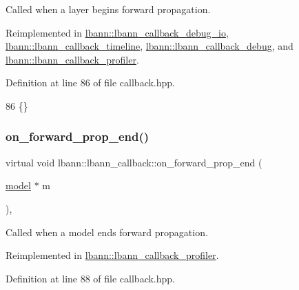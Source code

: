 Called when a layer begins forward propagation. 

Reimplemented in \hyperlink{classlbann_1_1lbann__callback__debug__io_aa31ee265d40edff982ebf38054394927}{lbann\+::lbann\+\_\+callback\+\_\+debug\+\_\+io}, \hyperlink{classlbann_1_1lbann__callback__timeline_a9c093b091fd38b79f8632cf786d29ce2}{lbann\+::lbann\+\_\+callback\+\_\+timeline}, \hyperlink{classlbann_1_1lbann__callback__debug_ac3e88ef582a7e3949b6e016ca2b17459}{lbann\+::lbann\+\_\+callback\+\_\+debug}, and \hyperlink{classlbann_1_1lbann__callback__profiler_adc7cf77381bec8ab1cc5ba5e554ec268}{lbann\+::lbann\+\_\+callback\+\_\+profiler}.



Definition at line 86 of file callback.\+hpp.


\begin{DoxyCode}
86 \{\}
\end{DoxyCode}
\mbox{\label{classlbann_1_1lbann__callback_a79a0bb407852d7b330b74373647ffe46}} 
\subsubsection{\texorpdfstring{on\+\_\+forward\+\_\+prop\+\_\+end()}{on\_forward\_prop\_end()}\hspace{0.1cm}{\footnotesize\ttfamily [1/2]}}
{\footnotesize\ttfamily virtual void lbann\+::lbann\+\_\+callback\+::on\+\_\+forward\+\_\+prop\+\_\+end (\begin{DoxyParamCaption}\item[{\hyperlink{classlbann_1_1model}{model} $\ast$}]{m }\end{DoxyParamCaption})\hspace{0.3cm}{\ttfamily [inline]}, {\ttfamily [virtual]}}

Called when a model ends forward propagation. 

Reimplemented in \hyperlink{classlbann_1_1lbann__callback__profiler_a63e3ad301cf8529acda00ac8f2531c93}{lbann\+::lbann\+\_\+callback\+\_\+profiler}.



Definition at line 88 of file callback.\+hpp.



